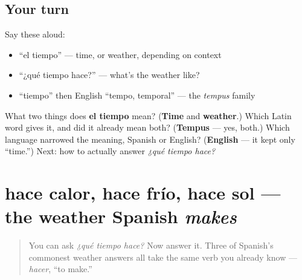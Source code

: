 \subsection*{Your turn}
Say these aloud:

\begin{itemize}
\raggedright
  \item \textquotedblleft{}el tiempo\textquotedblright{} — time, or weather, depending on context
  \item \textquotedblleft{}¿qué tiempo hace?\textquotedblright{} — what's the weather like?
  \item \textquotedblleft{}tiempo\textquotedblright{} then English \textquotedblleft{}tempo, temporal\textquotedblright{} — the \emph{tempus} family
\end{itemize}

\begin{tcolorbox}[breakable,colback=teal!4,colframe=teal!35!black,title={Before you move on}]
What two things does \textbf{el tiempo} mean? (\textbf{Time} and \textbf{weather}.) Which Latin word gives it, and did it already mean both? (\textbf{Tempus} — yes, both.) Which language narrowed the meaning, Spanish or English? (\textbf{English} — it kept only \textquotedblleft{}time.\textquotedblright{}) Next: how to actually answer \emph{¿qué tiempo hace?}
\end{tcolorbox}
\section[hace calor, hace frío, hace sol]{hace calor, hace frío, hace sol — the weather Spanish \emph{makes}}

\label{lesson:ES-C30-hace-calor}



\begin{quote}
You can ask \emph{¿qué tiempo hace?} Now answer it. Three of Spanish's commonest weather answers all take the same verb you already know — \emph{hacer}, \textquotedblleft{}to make.\textquotedblright{}
\end{quote}

